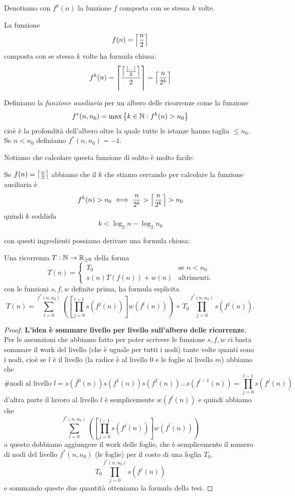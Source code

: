 \documentclass[11pt]{scrartcl}
\begin{document}
	\begin{definition}[Composizione]
		Denotiamo con $f^k(n)$ la funzione $f$ composta con se stessa $k$ volte.
	\end{definition}
	\begin{example}
		La funzione 
		$$f(n)=\left\lceil \frac{n}{2} \right\rceil$$
		composta con se stessa $k$ volte ha formula chiusa:
		$$f^k(n)=\ceiling{\frac{\ceiling{\frac{\ceiling{\dots}}{2}}}{2}}=\ceiling{\frac{n}{2^k}}$$
	\end{example}
	\begin{definition}
		Definiamo la \textit{funzione ausiliaria} per un albero delle ricorrenze come la funzione
		$$f^*(n,n_0)=\max\left\{k\in\mathbb N:f^k(n)>n_0\right\}$$
		cioè è la profondità dell'albero oltre la quale tutte le istanze hanno taglia $\le n_0$. Se $n<n_0$ definiamo $f^*(n,n_0)=-1$.
	\end{definition}
	Notiamo che calcolare questa funzione di solito è molto facile:
	\begin{example}
		Se $f(n)=\left\lceil \frac{n}{2} \right\rceil$ abbiamo che il $k$ che stiamo cercando per calcolare la funzione ausiliaria è
		$$f^k(n)>n_0 \iff \frac{n}{2^k}>\left\lceil \frac{n}{2^k} \right\rceil>n_0$$
		quindi $k$ soddisfa
		$$k<\log_2 n-\log_2 n_0$$
	\end{example}
	con questi ingredienti possiamo derivare una formula chiusa:
	\begin{theorem}
		Una ricorrenza $T:\mathbb N\to\mathbb R_{\ge 0}$ della forma
		$$
		T(n)=
		\begin{cases}
			T_0 & \text{se $n< n_0$} \\
			s(n)T(f(n))+w(n) & \text{altrimenti.}
		\end{cases}
		$$
		con le funzioni $s,f,w$ definite prima, ha formula esplicita
		$$
		T(n)=\sum_{l=0}^{f^*(n,n_0)}\left(\left[\prod_{j=0}^{l-1}s\left(f^j(n)\right)\right]w\left(f^l(n)\right)\right)+T_0\prod_{j=0}^{f^*(n,n_0)}s\left(f^j(n)\right).
		$$
	\end{theorem}
	\begin{proof}
		\textbf{L'idea è sommare livello per livello sull'albero delle ricorrenze}. Per le assunzioni che abbiamo fatto per poter scrivere le funzione $s,f,w$ ci basta sommare il work del livello (che è uguale per tutti i nodi) tante volte quanti sono i nodi, cioè se $l$ è il livello (la radice è al livello $0$ e le foglie al livello $m$) abbiamo che 
		$$\#\text{nodi al livello $l$}=s(f^0(n))s(f^1(n))s(f^2(n))\dots s(f^{l-1}(n))=\prod_{j=0}^{l-1}s\left(f^j(n)\right)$$
		d'altra parte il lavoro al livello $l$ è semplicemente $w(f^l(n))$ e quindi abbiamo che 
		$$\sum_{l=0}^{f^*(n,n_0)}\left(\left[\prod_{j=0}^{l-1}s\left(f^j(n)\right)\right]w\left(f^l(n)\right)\right)$$
		a questo dobbiamo aggiungere il work delle foglie, che è semplicemente il numero di nodi del livello $f^*(n,n_0)$ (le foglie) per il costo di una foglia $T_0$.
		$$T_0\prod_{j=0}^{f^*(n,n_0)}s\left(f^j(n)\right)$$
		e sommando queste due quantità otteniamo la formula della tesi. 
	\end{proof}
	
\end{document}
